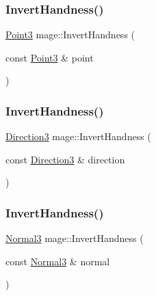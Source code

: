 \hypertarget{namespacemage_a20ded71f51e2014bab8e7d232eaf1c29}{}\label{namespacemage_a20ded71f51e2014bab8e7d232eaf1c29} 
\subsubsection{\texorpdfstring{Invert\+Handness()}{InvertHandness()}\hspace{0.1cm}{\footnotesize\ttfamily [2/4]}}
{\footnotesize\ttfamily \hyperlink{structmage_1_1_point3}{Point3} mage\+::\+Invert\+Handness (\begin{DoxyParamCaption}\item[{const \hyperlink{structmage_1_1_point3}{Point3} \&}]{point }\end{DoxyParamCaption})}

\hypertarget{namespacemage_a1d236e395736f7b5e28e52ccd3d643ae}{}\label{namespacemage_a1d236e395736f7b5e28e52ccd3d643ae} 
\subsubsection{\texorpdfstring{Invert\+Handness()}{InvertHandness()}\hspace{0.1cm}{\footnotesize\ttfamily [3/4]}}
{\footnotesize\ttfamily \hyperlink{structmage_1_1_direction3}{Direction3} mage\+::\+Invert\+Handness (\begin{DoxyParamCaption}\item[{const \hyperlink{structmage_1_1_direction3}{Direction3} \&}]{direction }\end{DoxyParamCaption})}

\hypertarget{namespacemage_a437458a2e3278f106da66534c5218e4e}{}\label{namespacemage_a437458a2e3278f106da66534c5218e4e} 
\subsubsection{\texorpdfstring{Invert\+Handness()}{InvertHandness()}\hspace{0.1cm}{\footnotesize\ttfamily [4/4]}}
{\footnotesize\ttfamily \hyperlink{structmage_1_1_normal3}{Normal3} mage\+::\+Invert\+Handness (\begin{DoxyParamCaption}\item[{const \hyperlink{structmage_1_1_normal3}{Normal3} \&}]{normal }\end{DoxyParamCaption})}

